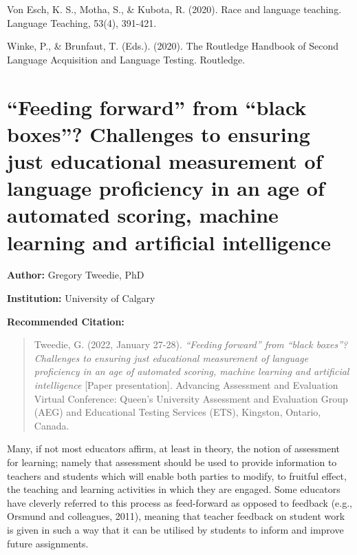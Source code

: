 \documentclass[
]{book}
\begin{document}
Von Esch, K. S., Motha, S., \& Kubota, R. (2020). Race and language teaching. Language Teaching, 53(4), 391-421.

Winke, P., \& Brunfaut, T. (Eds.). (2020). The Routledge Handbook of Second Language Acquisition and Language Testing. Routledge.

\newpage

\hypertarget{feeding-forward-from-black-boxes-challenges-to-ensuring-just-educational-measurement-of-language-proficiency-in-an-age-of-automated-scoring-machine-learning-and-artificial-intelligence}{%
\section{``Feeding forward'' from ``black boxes''? Challenges to ensuring just educational measurement of language proficiency in an age of automated scoring, machine learning and artificial intelligence}\label{feeding-forward-from-black-boxes-challenges-to-ensuring-just-educational-measurement-of-language-proficiency-in-an-age-of-automated-scoring-machine-learning-and-artificial-intelligence}}

\textbf{Author:} Gregory Tweedie, PhD

\textbf{Institution:} University of Calgary

\textbf{Recommended Citation:}

\begin{quote}
Tweedie, G. (2022, January 27-28). \emph{``Feeding forward'' from ``black boxes''? Challenges to ensuring just educational measurement of language proficiency in an age of automated scoring, machine learning and artificial intelligence} {[}Paper presentation{]}. Advancing Assessment and Evaluation Virtual Conference: Queen's University Assessment and Evaluation Group (AEG) and Educational Testing Services (ETS), Kingston, Ontario, Canada.
\end{quote}

Many, if not most educators affirm, at least in theory, the notion of assessment for learning; namely that assessment should be used to provide information to teachers and students which will enable both parties to modify, to fruitful effect, the teaching and learning activities in which they are engaged. Some educators have cleverly referred to this process as feed-forward as opposed to feedback (e.g., Orsmund and colleagues, 2011), meaning that teacher feedback on student work is given in such a way that it can be utilised by students to inform and improve future assignments.
\end{document}
